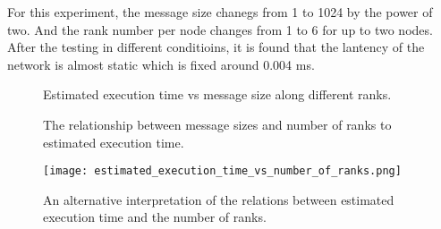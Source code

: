 
For this experiment, the message size chanegs from 1 to 1024 by the power of two.
And the rank number per node changes from 1 to 6 for up to two nodes.
After the testing in different conditioins, it is found that the lantency of the network is almost static which is fixed around 0.004 ms.

\begin{figure*}[h]
\centering
\hspace*{\fill}
\hspace*{\fill}
\hspace{0mm}
\hspace*{\fill}
\hspace{0mm}
\hspace*{\fill}
\caption{Estimated execution time vs message size along different ranks.}
\end{figure*}


\begin{figure*}[h!]
\hspace{0mm}
\hspace*{\fill}
\caption{The relationship between message sizes and number of ranks to estimated execution time.}
\end{figure*}


\begin{figure}[h]
\texttt{[image: estimated\_execution\_time\_vs\_number\_of\_ranks.png]}
\caption{An alternative interpretation of the relations between estimated execution time and the number of ranks.}
\end{figure}